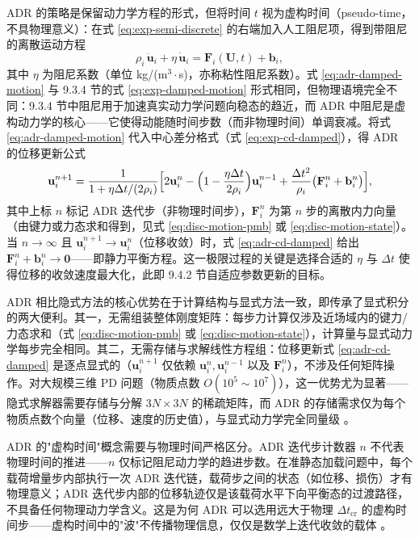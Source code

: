 ADR 的策略是保留动力学方程的形式，但将时间 $t$ 视为虚构时间（pseudo-time，不具物理意义）：在式 \eqref{eq:exp-semi-discrete} 的右端加入人工阻尼项，得到带阻尼的离散运动方程
\begin{equation}
  \rho_i\,\ddot{\mathbf{u}}_i
  +\eta\,\dot{\mathbf{u}}_i
  =\mathbf{F}_i(\mathbf{U},t)+\mathbf{b}_i,
  \label{eq:adr-damped-motion}
\end{equation}
其中 $\eta$ 为阻尼系数（单位 kg/(m$^3\cdot$s)，亦称粘性阻尼系数）。式 \eqref{eq:adr-damped-motion} 与 9.3.4 节的式 \eqref{eq:exp-damped-motion} 形式相同，但物理语境完全不同：9.3.4 节中阻尼用于加速真实动力学问题向稳态的趋近，而 ADR 中阻尼是虚构动力学的核心——它使得动能随时间步数（而非物理时间）单调衰减。将式 \eqref{eq:adr-damped-motion} 代入中心差分格式（式 \eqref{eq:exp-cd-damped}），得 ADR 的位移更新公式
\begin{equation}
  \mathbf{u}_i^{n+1}
  =\frac{1}{1+\eta\Delta t/(2\rho_i)}
  \Bigl[
  2\mathbf{u}_i^{n}
  -\Bigl(1-\frac{\eta\Delta t}{2\rho_i}\Bigr)\mathbf{u}_i^{n-1}
  +\frac{\Delta t^{2}}{\rho_i}
  \bigl(\mathbf{F}_i^{n}+\mathbf{b}_i^{n}\bigr)
  \Bigr],
  \label{eq:adr-cd-damped}
\end{equation}
其中上标 $n$ 标记 ADR 迭代步（非物理时间步），$\mathbf{F}_i^{n}$ 为第 $n$ 步的离散内力向量（由键力或力态求和得到，见式 \eqref{eq:disc-motion-pmb} 或 \eqref{eq:disc-motion-state}）。当 $n\to\infty$ 且 $\mathbf{u}_i^{n+1}\to\mathbf{u}_i^{n}$（位移收敛）时，式 \eqref{eq:adr-cd-damped} 给出 $\mathbf{F}_i^{n}+\mathbf{b}_i^{n}\to\mathbf{0}$——即静力平衡方程。这一极限过程的关键是选择合适的 $\eta$ 与 $\Delta t$ 使得位移的收敛速度最大化，此即 9.4.2 节自适应参数更新的目标。

ADR 相比隐式方法的核心优势在于计算结构与显式方法一致，即传承了显式积分的两大便利。其一，无需组装整体刚度矩阵：每步力计算仅涉及近场域内的键力/力态求和（式 \eqref{eq:disc-motion-pmb} 或 \eqref{eq:disc-motion-state}），计算量与显式动力学每步完全相同。其二，无需存储与求解线性方程组：位移更新式 \eqref{eq:adr-cd-damped} 是逐点显式的（$\mathbf{u}_i^{n+1}$ 仅依赖 $\mathbf{u}_i^{n},\mathbf{u}_i^{n-1}$ 以及 $\mathbf{F}_i^{n}$），不涉及任何矩阵操作。对大规模三维 PD 问题（物质点数 $O(10^5\sim10^7)$），这一优势尤为显著——隐式求解器需要存储与分解 $3N\times3N$ 的稀疏矩阵，而 ADR 的存储需求仅为每个物质点数个向量（位移、速度的历史值），与显式动力学完全同量级 \cite{KilicMadenci2010,MadenciOterkus2014}。

\begin{remark}
  ADR 的"虚构时间"概念需要与物理时间严格区分。ADR 迭代步计数器 $n$ 不代表物理时间的推进——$n$ 仅标记阻尼动力学的趋进步数。在准静态加载问题中，每个载荷增量步内部执行一次 ADR 迭代链，载荷步之间的状态（如位移、损伤）才有物理意义；ADR 迭代步内部的位移轨迹仅是该载荷水平下向平衡态的过渡路径，不具备任何物理动力学含义。这是为何 ADR 可以选用远大于物理 $\Delta t_{\text{cr}}$ 的虚构时间步——虚构时间中的"波"不传播物理信息，仅仅是数学上迭代收敛的载体 \cite{KilicMadenci2010}。
\end{remark}

